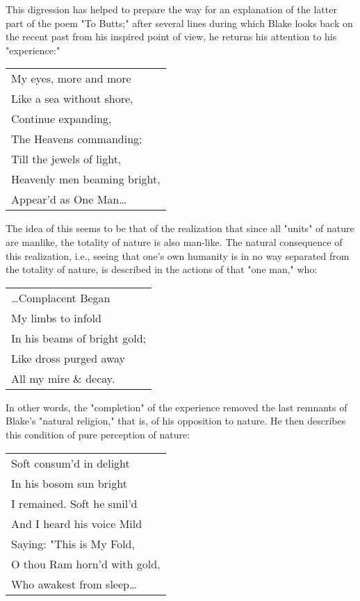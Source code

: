 This digression has helped to prepare the way for an explanation of the latter
part of the poem "To Butts;" after several lines during which Blake looks back on the
recent past from his inspired point of view, he returns his attention to his "experience:"\par
\begin{center}
	\parbox{0.8\textwidth}{
		\centering
		\begin{tabular}{l}
			My eyes, more and more       \\
			Like a sea without shore,    \\
			Continue expanding,          \\
			The Heavens commanding;      \\
			Till the jewels of light,    \\
			Heavenly men beaming bright, \\
			Appear'd as One Man\dots
		\end{tabular}
	}%
\end{center}
\hspace*{5mm}The idea of this seems to be that of the realization that since all "units" of nature
are manlike, the totality of nature is also man-like. The natural consequence of this
realization, i.e., seeing that one's own humanity is in no way separated from the totality
of nature, is described in the actions of that "one man," who:\par
\begin{center}
	\parbox{0.8\textwidth}{
		\centering
		\begin{tabular}{l}
			\dots Complacent Began       \\
			My limbs to infold           \\
			In his beams of bright gold; \\
			Like dross purged away       \\
			All my mire \& decay.
		\end{tabular}
	}%
\end{center}
\hspace*{5mm}In other words, the "completion" of the experience removed the last remnants of Blake's
"natural religion," that is, of his opposition to nature. He then describes this condition of
pure perception of nature:\par
\begin{center}
	\parbox{0.8\textwidth}{
		\centering
		\begin{tabular}{l}
			Soft consum'd in delight     \\
			In his bosom sun bright      \\
			I remained. Soft he smil'd   \\
			And I heard his voice Mild   \\
			Saying: "This is My Fold,    \\
			O thou Ram horn'd with gold, \\
			Who awakest from sleep\dots
		\end{tabular}
	}%
\end{center}
